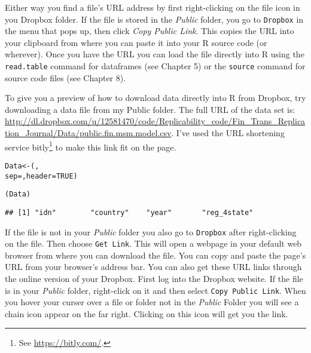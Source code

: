 Either way you find a file's URL address by first right-clicking on the file icon in you Dropbox folder. If the file is stored in the \emph{Public} folder, you go to \texttt{Dropbox} in the menu that pops up, then click \emph{Copy Public Link}. This copies the URL into your clipboard from where you can paste it into your R source code (or wherever). Once you have the URL you can load the file directly into R using the \texttt{read.table} command for dataframes (see Chapter 5) or the \texttt{source} command for source code files (see Chapter 8).

To give you a preview of how to download data directly into R from Dropbox, try downloading a data file from my Public folder. The full URL of the data set is: \url{http://dl.dropbox.com/u/12581470/code/Replicability_code/Fin_Trans_Replication_Journal/Data/public.fin.msm.model.csv}. I've used the URL shortening service bitly\footnote{See \url{https://bitly.com/}.}
to make this link fit on the page.

\begin{knitrout}
\color{fgcolor}\begin{kframe}
\begin{alltt}
Data <- (, 
                    sep = , header = TRUE)
                    
(Data)
\end{alltt}
\begin{verbatim}
## [1] "idn"        "country"    "year"       "reg_4state"
\end{verbatim}
\end{kframe}
\end{knitrout}


If the file is not in your \emph{Public} folder you also go to \texttt{Dropbox} after right-clicking on the file. Then choose \texttt{Get Link}. This will open a webpage in your default web browser from where you can download the file. You can copy and paste the page's URL from your browser's address bar. You can also get these URL links through the online version of your Dropbox. First log into the Dropbox website. If the file is in your \emph{Public} folder, right-click on it and then select \texttt{Copy Public Link}. When you hover your curser over a file or folder not in the \emph{Public} Folder you will see a chain icon appear on the far right. Clicking on this icon will get you the link.

